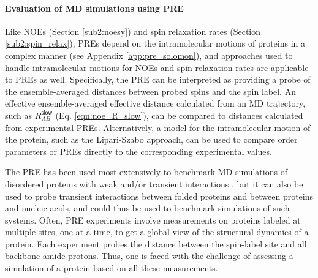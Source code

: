 \documentclass[9pt,review]{livecoms}
\begin{document}
\paragraph{Evaluation of MD simulations using PRE}

Like NOEs (Section \ref{sub2:noesy}) and spin relaxation rates (Section \ref{sub2:spin_relax}), PREs depend on the intramolecular motions of proteins in a complex manner (see Appendix \ref{app:pre_solomon}), and approaches used to handle intramolecular motions for NOEs and spin relaxation rates are applicable to PREs as well.
Specifically, the PRE can be interpreted as providing a probe of the ensemble-averaged distances between probed spins and the spin label.
An effective ensemble-averaged effective distance calculated from an MD trajectory, such as $R_{AB}^{\mathsf{slow}}$ (Eq. \ref{eqn:noe_R_slow}), can be compared to distances calculated from experimental PREs.
Alternatively, a model for the intramolecular motion of the protein, such as the Lipari-Szabo approach, can be used to compare order parameters or PREs directly to the corresponding experimental values.

The PRE has been used most extensively to benchmark MD simulations of disordered proteins with weak and/or transient interactions \cite{piana_water_2015,robustelli_developing_2018}, but it can also be used to probe transient interactions between folded proteins and between proteins and nucleic acids, and could thus be used to benchmark simulations of such systems.
Often, PRE experiments involve measurements on proteins labeled at multiple sites, one at a time, to get a global view of the structural dynamics of a protein.
Each experiment probes the distance between the spin-label site and all backbone amide protons.
Thus, one is faced with the challenge of assessing a simulation of a protein based on all these measurements.
\end{document}
